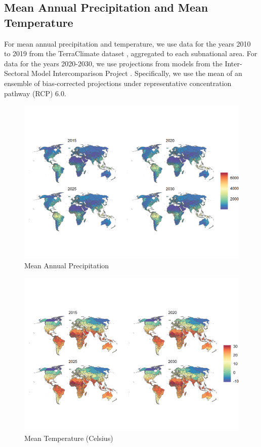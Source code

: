 \documentclass{article}
\begin{document}
\pagebreak
\subsection{Mean Annual Precipitation and Mean Temperature}
For mean annual precipitation and temperature, we use data for the years 2010 to 2019 from the TerraClimate dataset \citep{abatzoglou2018terraclimate}, aggregated to each subnational area.  For data for the years 2020-2030, we use projections from models from the Inter-Sectoral Model Intercomparison Project \citep{warszawski2014inter}.  Specifically, we use the mean of an ensemble of bias-corrected projections under representative concentration pathway (RCP) 6.0.

\begin{figure}[H]
  \centering
  \includegraphics[width=\linewidth]{img/covars/precip.png}
  \caption{Mean Annual Precipitation}
\end{figure}

\begin{figure}[H]
  \centering
  \includegraphics[width=\linewidth]{img/covars/tave.png}
  \caption{Mean Temperature (Celsius)}
\end{figure}
\end{document}

